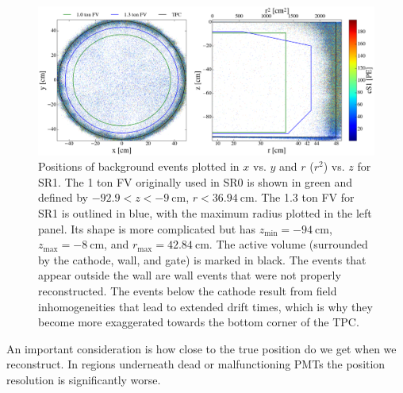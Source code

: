 {\begin{figure}
\centering
\includegraphics[width=\textwidth]{FVBoth}
\caption{Positions of background events plotted in $x$ vs. $y$ and $r$ ($r^2$) vs. $z$ for SR1.  The 1 ton FV originally used
in SR0 is shown in green and defined by $-92.9 < z < -9\ \mathrm{cm}$, $r < 36.94\ \mathrm{cm}$.  The 1.3 ton FV for SR1 is outlined in
blue, with the maximum radius plotted in the left panel.  Its shape is more complicated but has $z_\mathrm{min} = -94\ \mathrm{cm}$,
$z_{\mathrm{max}} = -8\ \mathrm{cm}$, and $r_{\mathrm{max}} = 42.84\ \mathrm{cm}$.  The active volume (surrounded by the cathode, wall,
and gate) is marked in black.  The events that appear outside the wall are wall events that were not properly
reconstructed.  The events below the cathode result from field inhomogeneities that lead to extended drift times, which is why they
become more exaggerated towards the bottom corner of the TPC.}
\label{fig:calibrations_position_reconstruction}
\end{figure}

An important consideration is how close to the true position do we get when we reconstruct.  In regions underneath dead or malfunctioning
PMTs the position resolution is significantly worse.

}
